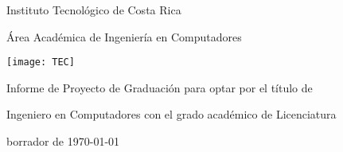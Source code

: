 
\thispagestyle{empty} 

\begin{center}

Instituto Tecnológico de Costa Rica

\par\vspace{1ex}

Área Académica de Ingeniería en Computadores

\par\vspace{20mm}

\texttt{[image: TEC]}

\par\vspace*{\fill}

{\large\bf{\scriptTitle}}

\par\vspace*{\fill}

Informe de Proyecto de Graduación para optar por el título de

Ingeniero en Computadores con el grado académico de Licenciatura

\par\vspace{20mm}

\scriptAuthor

\vspace*{\fill}

borrador de \today

\end{center}
\newpage 
\cleardoublepage 


